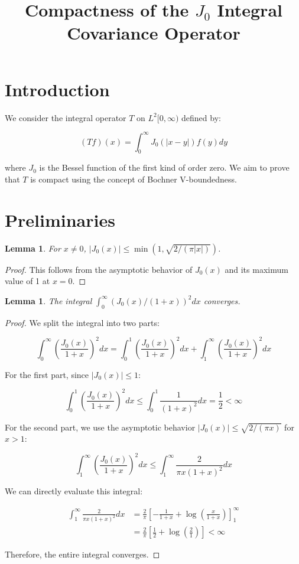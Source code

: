 \documentclass{article}
\title{Compactness of the $J_0$ Integral Covariance Operator}
\author{}
\date{}
\newtheorem{lemma}[theorem]{Lemma}
\begin{document}
\maketitle

\section{Introduction}

We consider the integral operator $T$ on $L^2[0,\infty)$ defined by:

\[(Tf)(x) = \int_0^\infty J_0(|x-y|)f(y)dy\]

where $J_0$ is the Bessel function of the first kind of order zero. We aim to prove that $T$ is compact using the concept of Bochner V-boundedness.

\section{Preliminaries}

\begin{lemma}
For $x \neq 0$, $|J_0(x)| \leq \min(1, \sqrt{2/(\pi|x|)})$.
\end{lemma}

\begin{proof}
This follows from the asymptotic behavior of $J_0(x)$ and its maximum value of 1 at $x = 0$.
\end{proof}

\begin{lemma}
\label{lem:integral}
The integral $\int_0^\infty (J_0(x)/(1+x))^2 dx$ converges.
\end{lemma}

\begin{proof}
We split the integral into two parts:

\[\int_0^\infty \left(\frac{J_0(x)}{1+x}\right)^2 dx = \int_0^1 \left(\frac{J_0(x)}{1+x}\right)^2 dx + \int_1^\infty \left(\frac{J_0(x)}{1+x}\right)^2 dx\]

For the first part, since $|J_0(x)| \leq 1$:

\[\int_0^1 \left(\frac{J_0(x)}{1+x}\right)^2 dx \leq \int_0^1 \frac{1}{(1+x)^2} dx = \frac{1}{2} < \infty\]

For the second part, we use the asymptotic behavior $|J_0(x)| \leq \sqrt{2/(\pi x)}$ for $x > 1$:

\[\int_1^\infty \left(\frac{J_0(x)}{1+x}\right)^2 dx \leq \int_1^\infty \frac{2}{\pi x(1+x)^2} dx\]

We can directly evaluate this integral:

\begin{align*}
\int_1^\infty \frac{2}{\pi x(1+x)^2} dx &= \frac{2}{\pi} \left[ -\frac{1}{1+x} + \log\left(\frac{x}{1+x}\right) \right]_1^\infty \\
&= \frac{2}{\pi} \left[ \frac{1}{2} + \log\left(\frac{2}{1}\right) \right] < \infty
\end{align*}

Therefore, the entire integral converges.
\end{proof}
\end{document}
